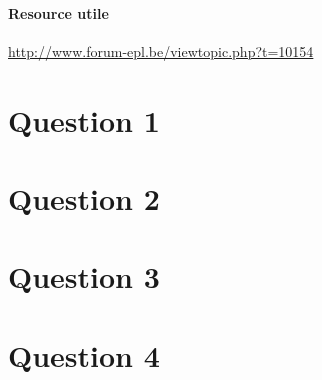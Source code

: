 


\paragraph{Resource utile}
\url{http://www.forum-epl.be/viewtopic.php?t=10154}

\section*{Question 1}
\solution{
}

\section*{Question 2}
\solution{
}

\section*{Question 3}
\solution{
}

\section*{Question 4}
\solution{
}


